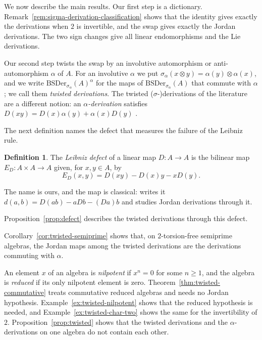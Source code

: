 \documentclass[]{interact}
\theoremstyle{plain}
\theoremstyle{definition}
\newtheorem{definition}[theorem]{Definition}
\theoremstyle{remark}
\newcommand{\BSDer}{\mathrm{BSDer}}
\begin{document}
We now describe the main results. %
Our first step is a dictionary.
Remark~\ref{rem:sigma-derivation-classification} shows that the identity gives exactly the derivations when $2$ is invertible, and the swap gives exactly the Jordan derivations. The two sign changes give all linear endomorphisms and the Lie derivations.

Our second step twists the swap by an involutive automorphism or anti-automorphism $\alpha$ of $A$.
For an involutive $\alpha$ we put $\sigma_\alpha(x \otimes y) = \alpha(y) \otimes \alpha(x)$, and we write $\BSDer_{\sigma_\alpha}(A)^\alpha$ for the maps of $\BSDer_{\sigma_\alpha}(A)$ that commute with $\alpha$; we call them \emph{twisted derivations}.
The twisted ($\sigma$-)derivations of the literature are a different notion: an \emph{$\alpha$-derivation} satisfies $D(xy) = D(x)\alpha(y) + \alpha(x)D(y)$ \citep[\S1]{HosseiniKarizaki2019}.

The next definition names the defect that measures the failure of the Leibniz rule. %
\begin{definition}\label{def:defect} %
The \emph{Leibniz defect} of a linear map $D \colon A \to A$ is the bilinear map $E_D \colon A \times A \to A$ given, for $x, y \in A$, by
\[
E_D(x,y) = D(xy) - D(x)y - xD(y).
\]
\end{definition}
The name is ours, and the map is classical: \citet[\S2]{Cusack1975} writes it $d(a,b) = D(ab) - aDb - (Da)b$ and studies Jordan derivations through it.

Proposition~\ref{prop:defect} describes the twisted derivations through this defect.

Corollary~\ref{cor:twisted-semiprime} shows that, on $2$-torsion-free semiprime algebras, the Jordan maps among the twisted derivations are the derivations commuting with $\alpha$.

An element $x$ of an algebra is \emph{nilpotent} if $x^n = 0$ for some $n \geq 1$, and the algebra is \emph{reduced} if its only nilpotent element is zero. %
Theorem~\ref{thm:twisted-commutative} treats commutative reduced algebras and needs no Jordan hypothesis.
Example~\ref{ex:twisted-nilpotent} shows that the reduced hypothesis is needed, and Example~\ref{ex:twisted-char-two} shows the same for the invertibility of $2$.
Proposition~\ref{prop:twisted} shows that the twisted derivations and the $\alpha$-derivations on one algebra do not contain each other.
\end{document}
